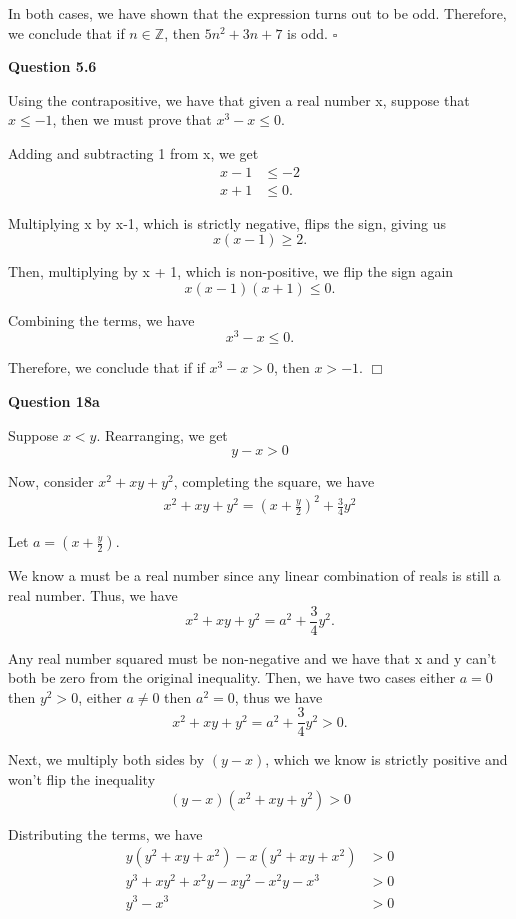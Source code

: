 \documentclass[12pt]{article}
\begin{document}
In both cases, we have shown that the expression turns out to be odd.
Therefore, we conclude that if $n\in{\mathbb{Z}}$, then $5n^2 +3n + 7$ is odd. $\square$

\vspace{50pt}

\noindent \textbf{Question 5.6}

Using the contrapositive, we have that given a real number x, suppose that $x \leq{-1}$, then we must prove that $x^3-x \leq{0}$.

Adding and subtracting 1 from x, we get
\begin{align*}
    x - 1 & \leq{-2} \\
    x + 1 & \leq{0}.
\end{align*}

Multiplying x by x-1, which is strictly negative, flips the sign, giving us
\[
    x(x-1) \geq{2}.
\]

Then, multiplying by x + 1, which is non-positive, we flip the sign again
\[
    x(x-1)(x+1) \leq{0}.
\]

Combining the terms, we have
\[
    x^3 -x \leq{0}.
\]

Therefore, we conclude that if if $x^3 - x > 0$, then $x > -1$. $\Box$

\vspace{50pt}

\noindent \textbf{Question 18a}

Suppose $x < y$. Rearranging, we get
\[
    y-x > 0
\]

Now, consider $x^2+xy+y^2$, completing the square, we have
\begin{align*}
    x^2+xy+y^2 = (x+\frac{y}{2})^2 + \frac{3}{4}y^2
\end{align*}

Let $a = (x+\frac{y}{2})$.

We know a must be a real number since any linear combination of reals is still a real number.
Thus, we have
\[
    x^2+xy+y^2 = a^2 + \frac{3}{4}y^2.
\]

Any real number squared must be non-negative and we have that x and y can't both be zero from the original inequality.
Then, we have two cases either $a = 0$ then $y^2>0$, either $a \neq{0}$ then $a^2 = 0$, thus we have
\[
    x^2+xy+y^2 = a^2 + \frac{3}{4}y^2 > 0.
\]

Next, we multiply both sides by $(y-x)$, which we know is strictly positive and won't flip the inequality
\[
    (y-x)(x^2+xy+y^2) > 0
\]

Distributing the terms, we have
\begin{align*}
    y(y^2 + xy + x^2) - x(y^2 + xy + x^2) & > 0 \\
    y^3 + xy^2 + x^2y - xy^2 - x^2y - x^3 & > 0 \\
    y^3 - x^3                             & > 0
\end{align*}
\end{document}
